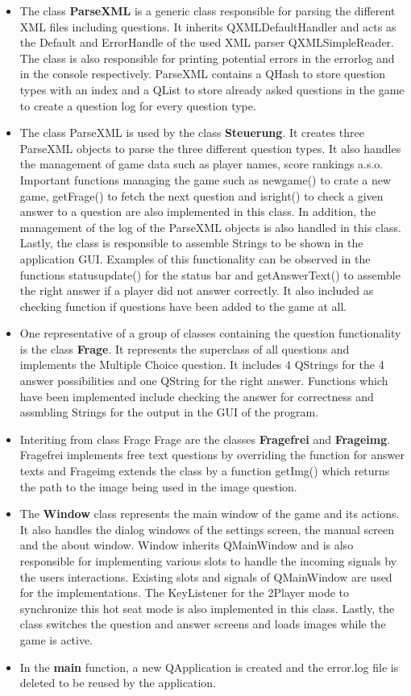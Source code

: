 \documentclass[10pt,a4paper,titlepage]{article}
\begin{document}
\begin{itemize}
	\item The class \textbf{ParseXML} is a generic class responsible for parsing the different XML files including questions. It inherits QXMLDefaultHandler and acts as the Default and ErrorHandle of the used XML parser QXMLSimpleReader. The class is also responsible for printing potential errors in the errorlog and in the console respectively. ParseXML contains a QHash to store question types with an index and a QList to store already asked questions in the game to create a question log for every question type. 
	\item The class ParseXML is used by the class \textbf{Steuerung}. It creates three ParseXML objects to parse the three different question types. It also handles the management of game data such as player names, score rankings a.s.o. Important functions managing the game such as newgame() to crate a new game, getFrage() to fetch the next question and isright() to check a given answer to a question are also implemented in this class. In addition, the management of the log of the ParseXML objects is also handled in this class. Lastly, the class is responsible to assemble Strings to be shown in the application GUI. Examples of this functionality can be observed in the functions statusupdate() for the status bar and getAnswerText() to assemble the right answer if a player did not answer correctly. It also included as checking function if questions have been added to the game at all.
	\item One representative of a group of classes containing the question functionality is the class \textbf{Frage}. It represents the superclass of all questions and implements the Multiple Choice question. It includes 4 QStrings for the 4 answer possibilities and one QString for the right answer. Functions which have been implemented include checking the answer for correctness and assmbling Strings for the output in the GUI of the program.
	\item Interiting from class Frage Frage are the classes \textbf{Fragefrei} and \textbf{Frageimg}.
	Fragefrei implements free text questions by overriding the function for answer texts and Frageimg extends the class by a function getImg() which returns the path to the image being used in the image question.
	\item The \textbf{Window} class represents the main window of the game and its actions. It also handles the dialog windows of the settings screen, the manual screen and the about window. Window inherits QMainWindow and is also responsible for implementing various slots to handle the incoming signals by the users interactions. Existing slots and signals of QMainWindow are used for the implementations. 
	The KeyListener for the 2Player mode to synchronize this hot seat mode is also implemented in this class. Lastly, the class switches the question and answer screens and loads images while the game is active.
	\item In the \textbf{main} function, a new QApplication is created and the error.log file is deleted to be reused by the application. 
\end{itemize}
\end{document}
